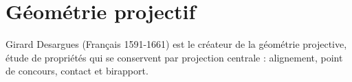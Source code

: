 \chapter{Géométrie projectif}
Girard Desargues (Français 1591-1661) est le créateur de la g\'eom\'etrie projective, étude de propri\'et\'es qui se conservent par projection centrale : alignement, point de concours, contact et birapport.
